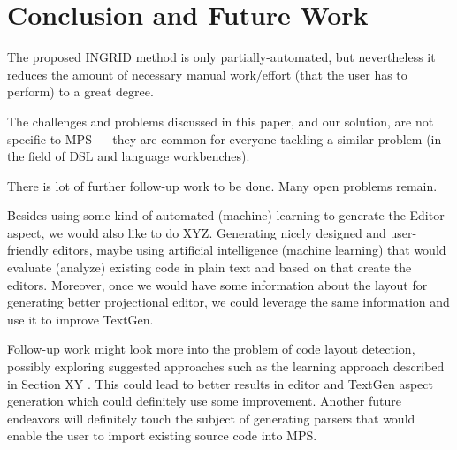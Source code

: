 \section{Conclusion and Future Work}

The proposed INGRID method is only partially-automated, but nevertheless it reduces the amount of necessary manual work/effort (that the user has to perform) to a great degree.

 The challenges and problems discussed in this paper, and our solution, are not specific to MPS --- they are common for everyone tackling a similar problem (in the field of DSL and language workbenches).


There is lot of further follow-up work to be done. Many open problems remain.

Besides using some kind of automated (machine) learning to generate the Editor aspect, we would also like to do XYZ.
Generating nicely designed and user-friendly editors, maybe using artificial intelligence (machine learning) that would evaluate (analyze) existing code in plain text and based on that create the editors.
Moreover, once we would have some information about the layout for generating better projectional editor, we could leverage the same information and use it to improve TextGen.

Follow-up work might look more into the problem of code layout detection, possibly exploring suggested approaches such as the learning approach described in Section XY .
This could lead to better results in editor and TextGen aspect generation which could definitely use some improvement.
Another future endeavors will definitely touch the subject of generating parsers that would enable the user to import existing source code into MPS.
